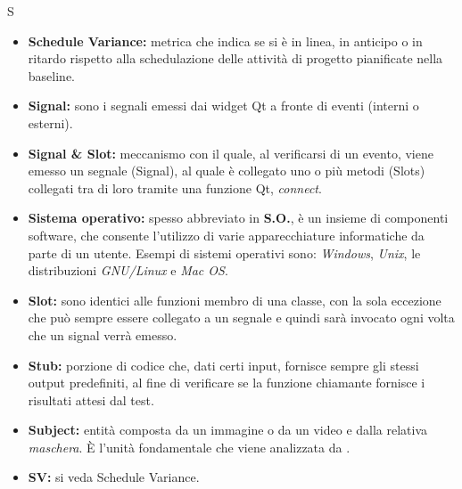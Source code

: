 \Huge S
\normalsize
\begin{itemize}
\item\textbf{Schedule Variance:} metrica che indica se si è in linea, in anticipo o in ritardo rispetto alla schedulazione delle attività di progetto pianificate nella baseline.

\item \textbf{Signal:} sono i segnali emessi dai widget Qt\glossario{} a fronte di eventi (interni o esterni).

\item \textbf{Signal \& Slot:} meccanismo con il quale, al verificarsi di un evento, viene emesso un segnale (Signal\glossario{}), al quale è collegato uno o più metodi (Slots\glossario{}) collegati tra di loro tramite una funzione Qt\glossario{}, \emph{connect}.

\item \textbf{Sistema operativo:} spesso abbreviato in \textbf{S.O.}, è un insieme di componenti software, che consente l'utilizzo di varie apparecchiature informatiche da parte di un utente. Esempi di sistemi operativi sono: \textit{Windows}, \textit{Unix}, le distribuzioni \textit{GNU/Linux} e \textit{Mac OS}.

\item \textbf{Slot:} sono identici alle funzioni membro di una classe, con la sola eccezione che può sempre essere collegato a un segnale e quindi sarà invocato ogni volta che un signal\glossario{} verrà emesso. 

\item\textbf{Stub:} porzione di codice che, dati certi input, fornisce sempre gli stessi output predefiniti, al fine di verificare se la funzione chiamante fornisce i risultati attesi dal test.

\item\textbf{Subject:} entità composta da un immagine o da un video e dalla relativa \textit{maschera}\glossario{}. È l'unità fondamentale che viene analizzata da \project{}.

\item\textbf{SV:} si veda Schedule Variance\glossario{}.
\end{itemize}
\pagebreak

